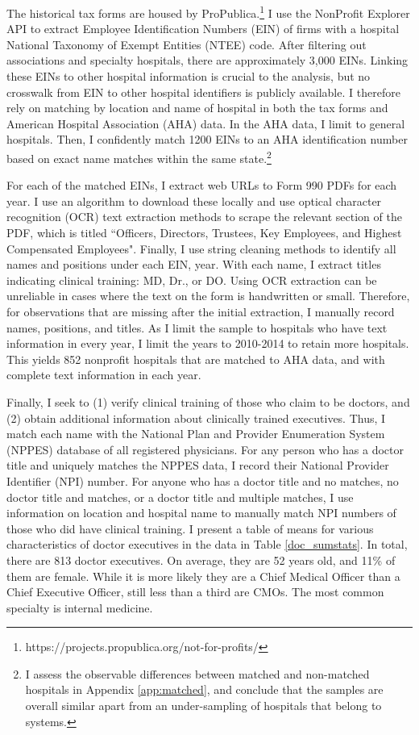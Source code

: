 \documentclass[12pt]{article}
\begin{document}
    The historical tax forms are housed by ProPublica.\footnote{https://projects.propublica.org/not-for-profits/} I use the NonProfit Explorer API to extract Employee Identification Numbers (EIN) of firms with a hospital National Taxonomy of Exempt Entities (NTEE) code. After filtering out associations and specialty hospitals, there are approximately 3,000 EINs. Linking these EINs to other hospital information is crucial to the analysis, but no crosswalk from EIN to other hospital identifiers is publicly available. I therefore rely on matching by location and name of hospital in both the tax forms and American Hospital Association (AHA) data. In the AHA data, I limit to general hospitals. Then, I confidently match 1200 EINs to an AHA identification number based on exact name matches within the same state.\footnote{I assess the observable differences between matched and non-matched hospitals in Appendix \ref{app:matched}, and conclude that the samples are overall similar apart from an under-sampling of hospitals that belong to systems.}
    
    For each of the matched EINs, I extract web URLs to Form 990 PDFs for each year. I use an algorithm to download these locally and use optical character recognition (OCR) text extraction methods to scrape the relevant section of the PDF, which is titled ``Officers, Directors, Trustees, Key Employees, and Highest Compensated Employees". Finally, I use string cleaning methods to identify all names and positions under each EIN, year. With each name, I extract titles indicating clinical training: MD, Dr., or DO. Using OCR extraction can be unreliable in cases where the text on the form is handwritten or small. Therefore, for observations that are missing after the initial extraction, I manually record names, positions, and titles. As I limit the sample to hospitals who have text information in every year, I limit the years to 2010-2014 to retain more hospitals. This yields 852 nonprofit hospitals that are matched to AHA data, and with complete text information in each year. 

    Finally, I seek to (1) verify clinical training of those who claim to be doctors, and (2) obtain additional information about clinically trained executives. Thus, I match each name with the National Plan and Provider Enumeration System (NPPES) database of all registered physicians. For any person who has a doctor title and uniquely matches the NPPES data, I record their National Provider Identifier (NPI) number. For anyone who has a doctor title and no matches, no doctor title and matches, or a doctor title and multiple matches, I use information on location and hospital name to manually match NPI numbers of those who did have clinical training. I present a table of means for various characteristics of doctor executives in the data in Table \ref{doc_sumstats}. In total, there are 813 doctor executives. On average, they are 52 years old, and 11\% of them are female. While it is more likely they are a Chief Medical Officer than a Chief Executive Officer, still less than a third are CMOs. The most common specialty is internal medicine. 
\end{document}
